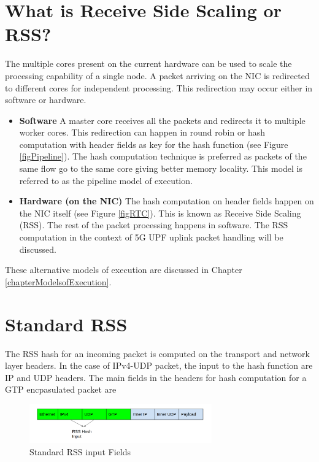 
\section{What is Receive Side Scaling or RSS? \label{sectionRSSIntroduction}}
The multiple cores present on the current hardware can be used to scale the processing capability of a single node.
A packet arriving on the NIC is redirected to different cores for independent processing. This redirection may occur either
in software or hardware.
\begin{itemize}
        \item \textbf{Software} A master core receives all the packets and redirects it to multiple  worker cores. This redirection can happen in round robin or hash computation with header fields as key for the hash function (see Figure \ref{figPipeline}). 
The hash computation technique is preferred as packets of the same flow go to the same core giving better memory locality. This model is referred to as the  pipeline model of execution. 
       \item  \textbf{Hardware (on the NIC)} The hash computation on header fields happen on the NIC itself (see Figure \ref{figRTC}). This is known as Receive Side Scaling (RSS). The rest of the packet processing happens in software. The RSS computation in the context of 5G UPF uplink packet handling will be discussed.  
\end{itemize}
These alternative models of execution are discussed in Chapter \ref{chapterModelsofExecution}. 

\section{Standard RSS \label{sectionstandardRSS}}



The RSS hash for an incoming packet is computed on the transport and network layer headers. In the case of IPv4-UDP packet, the input to the hash function are IP and UDP headers. The main fields in the headers for hash computation for a GTP encpasulated packet are
\begin{figure}[htbp]
    \centering
    \includegraphics[width=0.7\textwidth, keepaspectratio]{./fig/Ch3DDP/noDDPpacketHashFields.png}
    \caption{Standard RSS input Fields}
    \label{figStandardRSSfields}
\end{figure}

